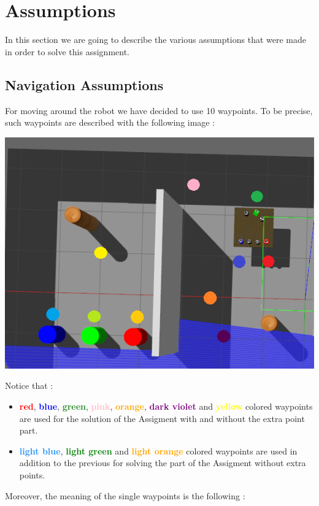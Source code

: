 \section{Assumptions}
In this section we are going to describe the various assumptions that were made in order to solve this assignment. 
\subsection{Navigation Assumptions}
For moving around the robot we have decided to use 10 waypoints.
To be precise, such waypoints are described with the following image :
\begin{center}
    \includegraphics[scale = 0.85]{images/assumptions/waypoints-short.png}    
\end{center}
    Notice that : 
    \begin{itemize}
    \item \textbf{\textcolor{red}{red}}, \textbf{\textcolor{blue}{blue}}, \textbf{\textcolor{ForestGreen}{green}}, \textbf{\textcolor{pink}{pink}}, \textbf{\textcolor{orange}{orange}}, \textbf{\textcolor{Purple}{dark violet}} and \textbf{\textcolor{yellow}{yellow}} colored waypoints are used for the solution of the Assigment with and without the extra point part.
    \item \textbf{\textcolor{DodgerBlue}{light blue}}, \textbf{\textcolor{green}{light green}} and \textbf{\textcolor{Orange}{light orange}} colored waypoints are used in addition to the previous for solving the part of the Assigment without extra points.
\end{itemize} 
Moreover, the meaning of the single waypoints is the following :
